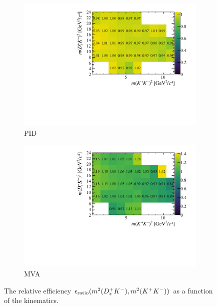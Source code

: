 \begin{figure}[!h]
   \centering
   \begin{subfigure}[t]{0.4\textwidth}
      \includegraphics[width=1.0\textwidth]{figs/B2DsKK/Relative_Eff_PID_All.pdf}
      \caption{PID}
      \label{fig:B2DsKK_releff_PID}
   \end{subfigure}
   \begin{subfigure}[t]{0.4\textwidth}
      \includegraphics[width=1.0\textwidth]{figs/B2DsKK/Relative_Eff_BDT_All.pdf}
      \caption{MVA}
      \label{fig:B2DsKK_releff_MVA}
   \end{subfigure}
   \caption{The relative efficiency $\epsilon_{\text{ratio}}(m^{2}({{D}^+_{s}}{{K}^-}),m^{2}({{K}^+}{{K}^-}))$ as a function of the \decay{\Bp}{\Dsp\Kp\Km} kinematics.}
   \label{fig:B2DsKK_dalitz_eff_three}
\end{figure}



